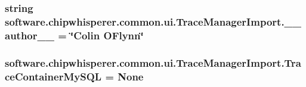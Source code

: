 \subsubsection[{\+\_\+\+\_\+author\+\_\+\+\_\+}]{\setlength{\rightskip}{0pt plus 5cm}string software.\+chipwhisperer.\+common.\+ui.\+Trace\+Manager\+Import.\+\_\+\+\_\+author\+\_\+\+\_\+ = \char`\"{}Colin O\textquotesingle{}Flynn\char`\"{}}\label{namespacesoftware_1_1chipwhisperer_1_1common_1_1ui_1_1TraceManagerImport_acbcd69c931723baa213fcb879dddd2c6}
\hypertarget{namespacesoftware_1_1chipwhisperer_1_1common_1_1ui_1_1TraceManagerImport_aee86f0dc8c76de831cf8c9428cdd2ff4}{}
\subsubsection[{Trace\+Container\+My\+S\+Q\+L}]{\setlength{\rightskip}{0pt plus 5cm}software.\+chipwhisperer.\+common.\+ui.\+Trace\+Manager\+Import.\+Trace\+Container\+My\+S\+Q\+L = None}\label{namespacesoftware_1_1chipwhisperer_1_1common_1_1ui_1_1TraceManagerImport_aee86f0dc8c76de831cf8c9428cdd2ff4}

